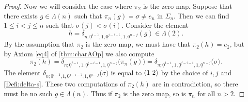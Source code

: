 \begin{proof}
Now we will consider the case where $\pi_2$ is the zero map.
Suppose that there exists $g \in \Lambda(n)$ such that $\pi_n(g) = \sigma \neq e_n$ in $\Sigma_n$.
Then we can find $1 \leq i < j \leq n$ such that $\sigma(j) < \sigma(i)$.
Consider the element 
\[
h = \delta_{n; \underline{0}^{i-1}, 1, \underline{0}^{j-i-1}, 1, \underline{0}^{n-j}}(g) \in \Lambda(2).
\]
By the assumption that $\pi_2$ is the zero map, we must have that $\pi_2(h) = e_2$, but by Axiom \ref{eq4} of \ref{thm:charAOp} we also compute
\[
\pi_2(h) = \delta_{n; \underline{0}^{i-1}, 1, \underline{0}^{j-i-1}, 1, \underline{0}^{n-j}}\big( \pi_n(g) \big) =  \delta_{n; \underline{0}^{i-1}, 1, \underline{0}^{j-i-1}, 1, \underline{0}^{n-j}}\big( \sigma \big).
\]
The element $\delta_{n; \underline{0}^{i-1}, 1, \underline{0}^{j-i-1}, 1, \underline{0}^{n-j}}\big( \sigma \big)$ is equal to $( 1 \, \, 2 )$ by the choice of $i, j$ and \cref{Defi:delta-s}.
These two computations of $\pi_2(h)$ are in contradiction, so there must be no such $g \in \Lambda(n)$.
Thus if $\pi_2$ is the zero map, so is $\pi_n$ for all $n>2$.
%
%
%


\end{proof}
